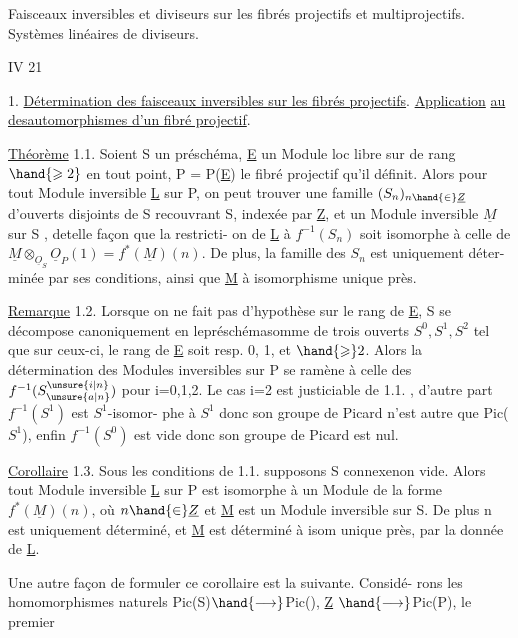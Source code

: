Faisceaux inversibles et diviseurs sur les fibrés projectifs et multiprojectifs. Systèmes linéaires de diviseurs. 

IV 21 

1. \uline{Détermination des faisceaux inversibles sur les fibrés projectifs}.
\uline{Application} \uline{au  des}\hand{/}\uline{automorphismes d'un fibré projectif}.

\uline{Théorème} 1.1. Soient S un préschéma, \underline{E} un Module loc libre sur  de
rang  $\hand{\geqslant 2}$ en tout point,
 P = P(\underline{E}) le fibré projectif qu'il définit. Alors
\placedmargin{\unsure{*|+}} pour tout Module inversible \underline{L} sur P, on peut trouver une famille
 $(S_n)_{n\hand{\in}\underline{Z}}$ d'ouverts disjoints de S recouvrant S, indexée par \underline{Z}, et
 un Module inversible $\underline{M}$ sur S , detelle façon que
 la restricti-%
on de \underline{L} à $f^{-1}(S_n)$ soit isomorphe à celle de $\underline{M}\otimes_{\underline{O}_S}\underline{O}_P(1) = f^*(\underline{M})(n)$.
De plus, la  famille des $S_n$  est uniquement déter-%
minée par ses conditions, ainsi que \underline{M} à isomorphisme unique près.

\uline{Remarque} 1.2. Lorsque on ne fait pas d'hypothèse sur le rang de \underline{E}, S se
décompose canoniquement en lepréschémasomme de trois ouverts $S^0,S^1,S^2$ tel que sur
ceux-ci, le rang de \underline{E} soit resp. 0, 1, et $\hand{\geqslant} 2$. Alors la détermination des
Modules inversibles sur P se ramène à celle des $f^{-1}(S^{\unsure{i|n}}_{\unsure{a|n}})$ pour i=0,1,2.
Le cas i=2 est justiciable de 1.1. , d'autre part $f^{-1}(S^1)$ est $S^1$-isomor-%
phe à $S^1$ donc son groupe de Picard n'est autre que Pic($S^1$), enfin
$f^{-1}(S^0)$ est vide donc son groupe de Picard est nul.

\uline{Corollaire} 1.3. Sous les conditions de 1.1. supposons S connexenon vide. Alors
tout Module inversible \underline{L} sur P est isomorphe à un Module de la forme
$f^*(\underline{M})(n)$, où $n\hand{\in}\underline{Z}$ et \underline{M} est un Module inversible sur S. De plus n est
uniquement déterminé, et \underline{M} est déterminé à isom unique près, par la donnée
de \underline{L}.\placedmargin{\ensuremath{\swarrow}}

Une autre façon de formuler ce corollaire est la suivante. Considé-%
rons les homomorphismes naturels Pic(S)$\hand{\longrightarrow}$Pic(), \underline{Z} $\hand{\longrightarrow}$Pic(P), le premier\placedmargin{\ensuremath{\swarrow}}
